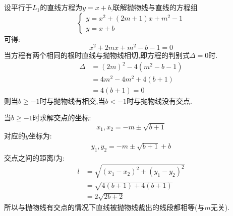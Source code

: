 \begin{questions}
\begin{solution}
\begin{penum}
			\item 设平行于$L_1$的直线方程为$y=x + b$,联解抛物线与直线的方程组
			      \begin{equation*}
				      \begin{cases}
					      y=x^2 + (2m+1)x + m^2 - 1 \\
					      y = x + b
				      \end{cases}
			      \end{equation*}
			      可得:
			      \begin{equation*}
				      x^2 + 2mx + m^2 - b - 1 = 0
			      \end{equation*}
			      当方程有两个相同的根时直线与抛物线相切,即方程的判别式$\Delta=0$时.
			      \begin{align*}
				      \Delta & = (2m)^2 - 4(m^2 - b - 1) \\
				             & = 4m^2 - 4m^2 + 4(b + 1)  \\
				             & = 4(b + 1) = 0
			      \end{align*}
			      则当$b\geqslant-1$时与抛物线有相交,当$b<-1$时与抛物线没有交点.

			      当$b\geqslant-1$时求解交点的坐标:
			      \begin{equation*}
				      x_1,x_2 = -m \pm \sqrt{b+1}
			      \end{equation*}
			      对应的$y$坐标为:
			      \begin{align*}
				      y_1,y_2 = -m \pm \sqrt{b+1} + b
			      \end{align*}
			      交点之间的距离$l$为:
			      \begin{align*}
				      l & = \sqrt{(x_1 - x_2)^2 + (y_1 - y_2)^2} \\
				        & = \sqrt{4(b + 1) + 4(b + 1)}           \\
				        & = 2\sqrt{2b + 2}
			      \end{align*}
			      所以与抛物线有交点的情况下直线被抛物线裁出的线段都相等(与$m$无关).

		\end{penum}
	\end{solution}

\end{questions}
